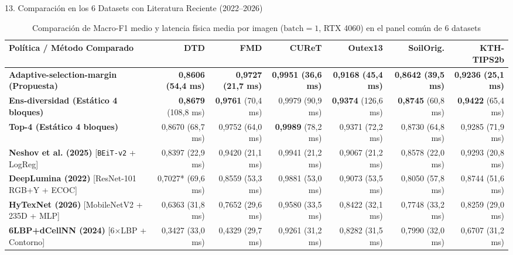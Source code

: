\documentclass[aspectratio=169,10pt]{beamer}
\begin{document}
\begin{frame}{13. Comparación en los 6 Datasets con Literatura Reciente (2022--2026)}
\begin{table}
\centering
\tiny
\caption{Comparación de Macro-F1 medio y latencia física media por imagen ($\text{batch}=1$, RTX 4060) en el panel común de 6 datasets}
\begin{tabular}{@{}lrrrrrr@{}}
\toprule
Política / Método Comparado & DTD & FMD & CUReT & Outex13 & SoilOrig. & KTH-TIPS2b \\
\midrule
\textbf{Adaptive-selection-margin (Propuesta)} & \textbf{0,8606 (54,4 ms)} & \textbf{0,9727 (21,7 ms)} & \textbf{0,9951 (36,6 ms)} & \textbf{0,9168 (45,4 ms)} & \textbf{0,8642 (39,5 ms)} & \textbf{0,9236 (25,1 ms)} \\
\textbf{Ens-diversidad (Estático 4 bloques)} & \textbf{0,8679} (108,8 ms) & \textbf{0,9761} (70,4 ms) & 0,9979 (90,9 ms) & \textbf{0,9374} (126,6 ms) & \textbf{0,8745} (60,8 ms) & \textbf{0,9422} (65,4 ms) \\
\textbf{Top-4 (Estático 4 bloques)} & 0,8670 (68,7 ms) & 0,9752 (64,0 ms) & \textbf{0,9989} (78,2 ms) & 0,9371 (72,2 ms) & 0,8730 (64,8 ms) & 0,9285 (71,9 ms) \\
\midrule
\textbf{Neshov et al. (2025)} [\texttt{BEiT-v2} + LogReg] & 0,8397 (22,9 ms) & 0,9420 (21,1 ms) & 0,9941 (21,2 ms) & 0,9067 (21,2 ms) & 0,8578 (22,0 ms) & 0,9293 (20,8 ms) \\
\textbf{DeepLumina (2022)} [ResNet-101 RGB+Y + ECOC] & 0,7027* (69,6 ms) & 0,8559 (53,3 ms) & 0,9881 (53,0 ms) & 0,9073 (53,5 ms) & 0,8050 (57,8 ms) & 0,8744 (51,6 ms) \\
\textbf{HyTexNet (2026)} [MobileNetV2 + 235D + MLP] & 0,6363 (31,8 ms) & 0,7652 (29,6 ms) & 0,9580 (33,5 ms) & 0,8422 (32,1 ms) & 0,7748 (33,2 ms) & 0,8259 (29,0 ms) \\
\textbf{6LBP+dCellNN (2024)} [6$\times$LBP + Contorno] & 0,3427 (33,0 ms) & 0,4329 (29,7 ms) & 0,9261 (31,2 ms) & 0,8282 (31,5 ms) & 0,7990 (32,0 ms) & 0,6707 (31,2 ms) \\
\bottomrule
\end{tabular}
\end{table}
\vspace{-0.5em}
\begin{columns}[T]
\begin{column}{0.51\textwidth}

\end{column}
\end{columns}
\end{frame}
\end{document}
